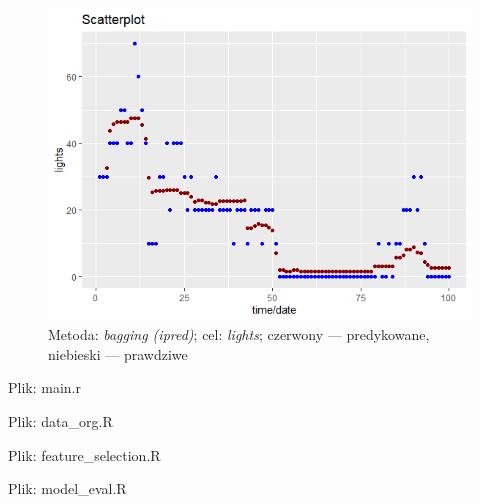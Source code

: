 \documentclass[a4paper,11pt,twoside]{mwrep}  %
\begin{document}
 \begin{figure}[!h]
    \centering \includegraphics{../scatter_lights.png}
    \caption{Metoda: \textit{bagging (ipred)}; cel: \textit{lights}; czerwony --- predykowane, niebieski --- prawdziwe}
    \label{fig:scatter_lights}
\end{figure}

\endgroup



\clearpage		
\pagebreak
Plik: main.r

\clearpage

\pagebreak
Plik: data{\_}org.R

\clearpage

\pagebreak
Plik: feature{\_}selection.R

\clearpage

\pagebreak
Plik: model{\_}eval.R

\clearpage
\end{document}
